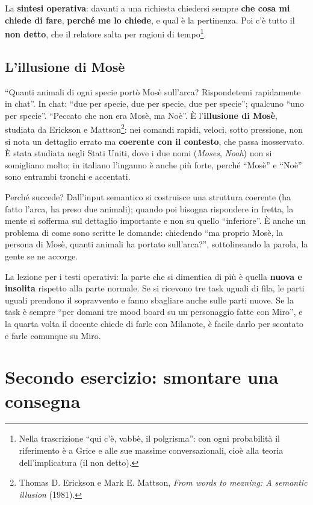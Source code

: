 La \textbf{sintesi operativa}: davanti a una richiesta chiedersi sempre
\textbf{che cosa mi chiede di fare}, \textbf{perché me lo chiede}, e qual è la
pertinenza. Poi c'è tutto il \textbf{non detto}, che il relatore salta per
ragioni di tempo\footnote{Nella trascrizione ``qui c'è, vabbè, il polgrisma'':
con ogni probabilità il riferimento è a Grice e alle sue massime
conversazionali, cioè alla teoria dell'implicatura (il non detto).}.

\subsection{L'illusione di Mosè}

``Quanti animali di ogni specie portò Mosè sull'arca? Rispondetemi rapidamente
in chat''. In chat: ``due per specie, due per specie, due per specie''; qualcuno
``uno per specie''. ``Peccato che non era Mosè, ma Noè''. È l'\textbf{illusione
di Mosè}, studiata da Erickson e Mattson\footnote{Thomas D. Erickson e Mark E.
Mattson, \emph{From words to meaning: A semantic illusion} (1981).}: nei
comandi rapidi, veloci, sotto pressione, non si nota un dettaglio errato ma
\textbf{coerente con il contesto}, che passa inosservato. È stata studiata
negli Stati Uniti, dove i due nomi (\emph{Moses}, \emph{Noah}) non si somigliano
molto; in italiano l'inganno è anche più forte, perché ``Mosè'' e ``Noè'' sono
entrambi tronchi e accentati.

Perché succede? Dall'input semantico si costruisce una struttura coerente (ha
fatto l'arca, ha preso due animali); quando poi bisogna rispondere in fretta, la
mente si sofferma sul dettaglio importante e non su quello ``inferiore''. È
anche un problema di come sono scritte le domande: chiedendo ``ma proprio
Mosè, la persona di Mosè, quanti animali ha portato sull'arca?'', sottolineando
la parola, la gente se ne accorge.

La lezione per i testi operativi: la parte che si dimentica di più è quella
\textbf{nuova e insolita} rispetto alla parte normale. Se si ricevono tre task
uguali di fila, le parti uguali prendono il sopravvento e fanno sbagliare anche
sulle parti nuove. Se la task è sempre ``per domani tre mood board su un
personaggio fatte con Miro'', e la quarta volta il docente chiede di farle con
Milanote, è facile darlo per scontato e farle comunque su Miro.

\section{Secondo esercizio: smontare una consegna}
\label{pt:sec:es2}

